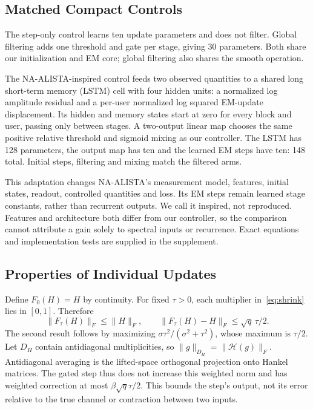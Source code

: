 \documentclass[10pt,journal,letterpaper]{IEEEtran}
\newcommand{\HH}{\mathcal{H}}
\begin{document}
\subsection{Matched Compact Controls}
The step-only control learns ten update parameters and does not filter. Global filtering adds one threshold and gate per stage, giving 30 parameters. Both share our initialization and EM core; global filtering also shares the smooth operation.

The NA-ALISTA-inspired control feeds two observed quantities to a shared long short-term memory (LSTM) cell with four hidden units: a normalized log amplitude residual and a per-user normalized log squared EM-update displacement. Its hidden and memory states start at zero for every block and user, passing only between stages. A two-output linear map chooses the same positive relative threshold and sigmoid mixing as our controller. The LSTM has 128 parameters, the output map has ten and the learned EM steps have ten: 148 total. Initial steps, filtering and mixing match the filtered arms.

This adaptation changes NA-ALISTA's measurement model, features, initial states, readout, controlled quantities and loss. Its EM steps remain learned stage constants, rather than recurrent outputs. We call it inspired, not reproduced. Features and architecture both differ from our controller, so the comparison cannot attribute a gain solely to spectral inputs or recurrence. Exact equations and implementation tests are supplied in the supplement.

\subsection{Properties of Individual Updates}
Define $F_0(H)=H$ by continuity. For fixed $\tau>0$, each multiplier in~\eqref{eq:shrink} lies in $[0,1]$. Therefore
\begin{equation}
 \|F_\tau(H)\|_F\le\|H\|_F,\qquad
 \|F_\tau(H)-H\|_F\le\sqrt q\,\tau/2.
 \label{eq:bound}
\end{equation}
The second result follows by maximizing $\sigma\tau^2/(\sigma^2+\tau^2)$, whose maximum is $\tau/2$. Let $D_H$ contain antidiagonal multiplicities, so $\|g\|_{D_H}=\|\HH(g)\|_F$. Antidiagonal averaging is the lifted-space orthogonal projection onto Hankel matrices. The gated step thus does not increase this weighted norm and has weighted correction at most $\beta\sqrt q\tau/2$. This bounds the step's output, not its error relative to the true channel or contraction between two inputs.
\end{document}
